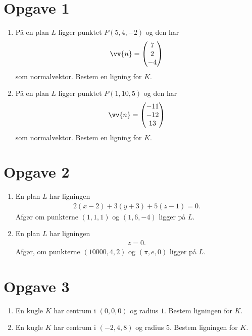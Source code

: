 \section*{Opgave 1}
\begin{enumerate}[label=\roman*)]
	\item På en plan $L$ ligger punktet $P(5,4,-2)$ og den har 
	\begin{align*}
		\vv{n} = 
		\begin{pmatrix}
			7 \\ 2 \\ -4
		\end{pmatrix} 
	\end{align*}
	som normalvektor. Bestem en ligning for $K$. 
	\item På en plan $L$ ligger punktet $P(1,10,5)$ og den har 
	\begin{align*}
		\vv{n} = 
		\begin{pmatrix}
			-11 \\ -12 \\ 13
		\end{pmatrix} 
	\end{align*}
	som normalvektor. Bestem en ligning for $K$. 
\end{enumerate}

\section*{Opgave 2}
\begin{enumerate}[label=\roman*)]
	\item En plan $L$ har ligningen
	\begin{align*}
		2(x-2) + 3(y+3) +5(z-1) = 0.
	\end{align*}
	Afgør om punkterne $(1,1,1)$ og $(1,6,-4)$ ligger på $L$. 
	\item En plan $L$ har ligningen 
	\begin{align*}
		z=0.
	\end{align*}
	Afgør, om punkterne $(10000,4,2)$ og $(\pi, e,0)$ ligger på $L$.
\end{enumerate}

\section*{Opgave 3}
\begin{enumerate}[label=\roman*)]
	\item En kugle $K$ har centrum i $(0,0,0)$ og radius $1$. Bestem ligningen for $K$. 
	\item En kugle $K$ har centrum i $(-2,4,8)$ og radius $5$. Bestem ligningen for $K$.
\end{enumerate}
